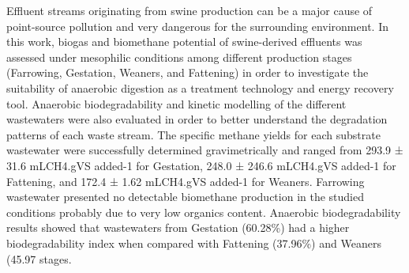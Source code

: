 Effluent streams originating from swine production can be a major cause of point-source pollution and very dangerous for the surrounding environment. In this work, biogas and biomethane potential of swine-derived effluents was assessed under mesophilic conditions among different production stages (Farrowing, Gestation, Weaners, and Fattening) in order to investigate the suitability of anaerobic digestion as a treatment technology and energy recovery tool. Anaerobic biodegradability and kinetic modelling of the different wastewaters were also evaluated in order to better understand the degradation patterns of each waste stream. The specific methane yields for each substrate wastewater were successfully determined gravimetrically and ranged from 293.9 ± 31.6 mLCH4.gVS added-1 for Gestation, 248.0 ± 246.6 mLCH4.gVS added-1 for Fattening, and 172.4 ± 1.62 mLCH4.gVS added-1 for Weaners. Farrowing wastewater presented no detectable biomethane production in the studied conditions probably due to very low organics content.  Anaerobic biodegradability results showed that wastewaters from Gestation (60.28\%) had a higher biodegradability index when compared with Fattening (37.96\%) and Weaners (45.97\) stages.